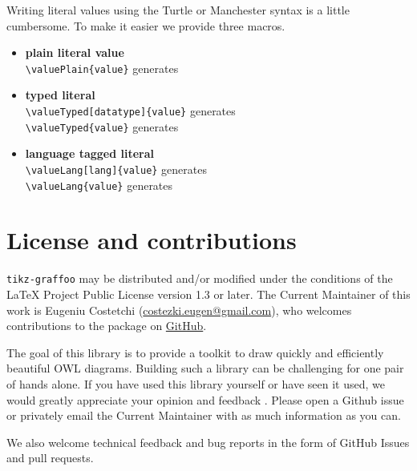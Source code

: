 Writing literal values using the Turtle or Manchester syntax is a little cumbersome. To make it easier we provide three macros. 

\begin{itemize}
	\item \textbf{plain literal value}\\
	\verb|| generates \valuePlain{value}
	\item \textbf{typed literal}\\
	\verb|\valueTyped[datatype]{value}| generates \\
	\verb|| generates \valueTyped{value}
	\item \textbf{language tagged literal}\\
	\verb|\valueLang[lang]{value}| generates \\
	\verb|| generates \valueLang{value}
\end{itemize}

\section{License and contributions}
\texttt{tikz-graffoo} may be distributed and/or modified under the conditions of the LaTeX Project
Public License version 1.3 or later. The Current Maintainer of this work is Eugeniu Costetchi (\url{costezki.eugen@gmail.com}), who welcomes contributions to the
package on \href{https://github.com/costezki/owl4latex}{GitHub}.

The goal of this library is to provide a toolkit to draw quickly and efficiently beautiful OWL diagrams. Building such a library can be challenging for one pair of hands alone. If you have used this library yourself or have seen it used, we would greatly appreciate your opinion and feedback . Please open a Github issue or privately email the Current Maintainer with as much information as you can. 

We also welcome technical feedback and bug reports in the form of GitHub Issues
and pull requests.


